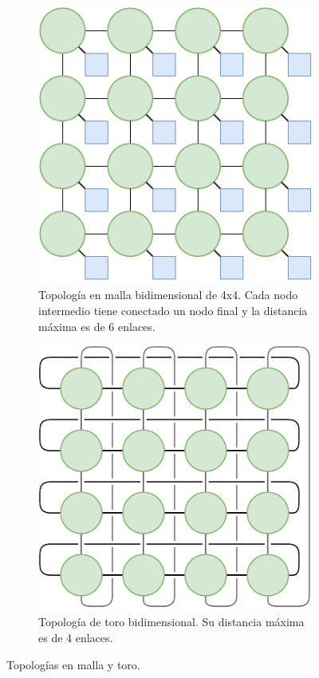\begin{figure}[p]
    \centering
    \begin{subfigure}[t]{.45\textwidth}
        \centering
        \includegraphics{images/diagrams/topology_mesh.drawio.pdf}
        \caption[Topología en malla bidimensional.]{Topología en malla bidimensional de 4x4. Cada nodo intermedio tiene conectado un nodo final y la distancia máxima es de 6 enlaces.}
        \label{fig:topology_mesh}
    \end{subfigure}\hfill
    \begin{subfigure}[t]{.5\textwidth}
        \centering
        \includegraphics{images/diagrams/topology_thorus.drawio.pdf}
        \caption[Topología de toro bidimensional.]{Topología de toro bidimensional. Su distancia máxima es de 4 enlaces.}
        \label{fig:topology_thorus}
    \end{subfigure}
    \caption{Topologías en malla y toro.}
    \label{fig:topology_mesh_thorus}
\end{figure}

